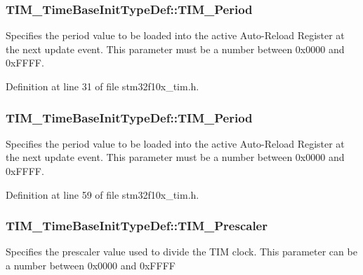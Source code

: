 \subsubsection[{\texorpdfstring{T\+I\+M\+\_\+\+Period}{TIM_Period}}]{ T\+I\+M\+\_\+\+Time\+Base\+Init\+Type\+Def\+::\+T\+I\+M\+\_\+\+Period}\hypertarget{struct_t_i_m___time_base_init_type_def_a29f547094a15efca303f2489d0050787}{}\label{struct_t_i_m___time_base_init_type_def_a29f547094a15efca303f2489d0050787}
Specifies the period value to be loaded into the active Auto-\/\+Reload Register at the next update event. This parameter must be a number between 0x0000 and 0x\+F\+F\+FF. 

Definition at line 31 of file stm32f10x\+\_\+tim.\+h.

\subsubsection[{\texorpdfstring{T\+I\+M\+\_\+\+Period}{TIM_Period}}]{ T\+I\+M\+\_\+\+Time\+Base\+Init\+Type\+Def\+::\+T\+I\+M\+\_\+\+Period}\hypertarget{struct_t_i_m___time_base_init_type_def_aeb5b90dc8f8a1ab85584e732789b2ee4}{}\label{struct_t_i_m___time_base_init_type_def_aeb5b90dc8f8a1ab85584e732789b2ee4}
Specifies the period value to be loaded into the active Auto-\/\+Reload Register at the next update event. This parameter must be a number between 0x0000 and 0x\+F\+F\+FF. 

Definition at line 59 of file stm32f10x\+\_\+tim.\+h.

\subsubsection[{\texorpdfstring{T\+I\+M\+\_\+\+Prescaler}{TIM_Prescaler}}]{ T\+I\+M\+\_\+\+Time\+Base\+Init\+Type\+Def\+::\+T\+I\+M\+\_\+\+Prescaler}\hypertarget{struct_t_i_m___time_base_init_type_def_afb7468d52475ad78bc290e7b42b90ac6}{}\label{struct_t_i_m___time_base_init_type_def_afb7468d52475ad78bc290e7b42b90ac6}
Specifies the prescaler value used to divide the T\+IM clock. This parameter can be a number between 0x0000 and 0x\+F\+F\+FF 

